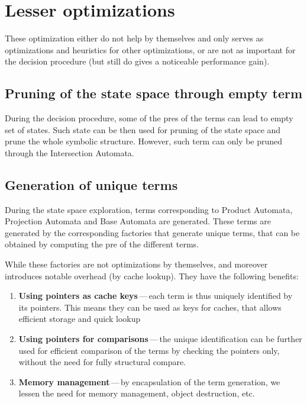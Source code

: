 \section{Lesser optimizations}
These optimization either do not help by themselves and only serves
as optimizations and heuristics for other optimizations, or are not
as important for the decision procedure (but still do gives a 
noticeable performance gain).

  \subsection{Pruning of the state space through empty term}
  
  During the decision procedure, some of the pres of the terms can
  lead to empty set of states. Such state can be then used for 
  pruning of the state space and prune the whole symbolic structure.
  However, such term can only be pruned through the Intersection 
  Automata.
  
  \subsection{Generation of unique terms}\label{opt:unique}
  
  During the state space exploration, terms corresponding to Product
  Automata, Projection Automata and Base Automata are generated.
  These terms are generated by the corresponding factories that
  generate unique terms, that can be obtained by computing the
  pre of the different terms.
  
  While these factories are not optimizations by themselves, and 
  moreover introduces notable overhead (by cache lookup). They 
  have the following benefits:
  \begin{enumerate}
  	\item \textbf{Using pointers as cache keys}\,---\,each term is
  	thus uniquely identified by its pointers. This means they can
  	be used as keys for caches, that allows efficient storage and
  	quick lookup
  	\item \textbf{Using pointers for comparisons}\,---\,the unique
  	identification can be further used for efficient comparison of
  	the terms by checking the pointers only, without the need for
  	fully structural compare.
  	\item \textbf{Memory management}\,---\,by encapsulation of the
  	term generation, we lessen the need for memory management, 
  	object destruction, etc.
  \end{enumerate}
  
